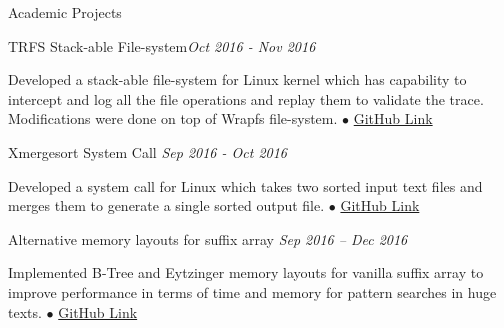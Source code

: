 \documentclass{resume} %
\begin{document}
\begin{rSection}{Academic Projects}

\begin{rSubsection}{TRFS Stack-able File-system}{\emph{Oct 2016 - Nov 2016}}{}{}
\item Developed a stack-able file-system for Linux kernel which has capability to intercept and log all the file operations and replay them to validate the trace. Modifications were done on top of Wrapfs file-system.
{\tiny$\bullet$}
\href{https://github.com/t-lohani/TRFS-Stackable-Filesystem}{GitHub Link}
\end{rSubsection}


\begin{rSubsection}{Xmergesort System Call} {\emph {Sep 2016 - Oct 2016}}{}{}
\item Developed a system call for Linux which takes two sorted input text files and merges them to generate a single sorted output file.
{\tiny$\bullet$}	 
\href{https://github.com/t-lohani/Xmergesort-System-Call}{GitHub Link}
\end{rSubsection}


\begin{rSubsection}{Alternative memory layouts for suffix array} {\emph {Sep 2016 -- Dec 2016}}{}{}
\item Implemented B-Tree and Eytzinger memory layouts for vanilla suffix array to improve performance in terms of time and memory for pattern searches in huge texts.
{\tiny$\bullet$}
\href{https://github.com/t-lohani/Suffixarray-Layout}{GitHub Link}
\end{rSubsection}




\end{rSection}
\end{document}
